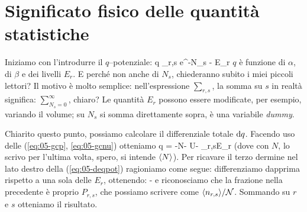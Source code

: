 \section{Significato fisico delle quantità statistiche}
\label{sec:05-significato}

Iniziamo con l'introdurre il $q$--potenziale:
\be
q \equiv \ln\sum_{r,s} e^{-\alpha N_s - \beta E_r}
\ee
$q$ è funzione di $\alpha$, di $\beta$ e dei livelli $E_r$. E perché non anche di $N_s$, chiederanno subito i miei piccoli lettori? Il motivo è molto semplice: nell'espressione $\sum_{r,s}$, la somma su $s$ in realtà significa: $\sum_{N_s=0}^\infty$, chiaro? Le quantità $E_r$ possono essere modificate, per esempio, variando il volume; su $N_s$ si somma direttamente sopra, è una variabile {\em dummy}.

Chiarito questo punto, possiamo calcolare il differenziale totale ${\textrm d}q$. Facendo uso delle (\ref{eq:05-gcp}, \ref{eq:05-gcnu}) otteniamo
\be
\label{eq:05-deqpot}
\de q = -N\de\alpha - U\de\beta - \frac{\beta}{\calN}\sum_{r,s}\aspetta{\nrs}\de E_r
\ee
(dove con $N$, lo scrivo per l'ultima volta, spero, si intende $\langle N\rangle$).
Per ricavare il terzo dermine nel lato destro della (\ref{eq:05-deqpot}) ragioniamo come segue: differenziamo dapprima rispetto a una sola delle $E_r$, ottenendo:
\be
-\beta {}
\ee
e riconosciamo che la frazione nella precedente è proprio $P_{r,s}$, che possiamo scrivere come $\langle n_{r,s}\rangle/{\mathcal N}$. Sommando su $r$ e $s$ otteniamo il risultato.

